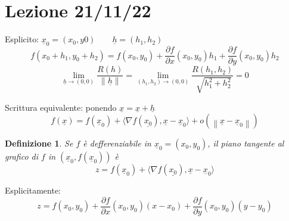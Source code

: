 \documentclass{scrreprt}
\newtheorem{defn}{Definizione}
\newenvironment{definition}{\begin{mdframed}[backgroundcolor=Ivory2]\begin{defn}}{\end{defn}\end{mdframed}}
\begin{document}
\section*{Lezione 21/11/22}

Esplicito: $\underline{x}_0 = (x_0, y0) \quad \quad \underline{h} = (h_1,h_2)$
\begin{equation}
	f(x_0 + h_1, y_0 + h_2) = f(x_0,y_0) + \frac{\partial f}{\partial x} (x_0, y_0) h_1 + \frac{\partial f}{\partial y} (x_0, y_0) h_2
\end{equation}
\begin{equation}
	\lim_{\underline{h} \to (0,0)} \frac{R(h)}{\left\lVert \underline{h} \right\rVert } = \lim_{(h_1, h_2) \to (0,0)} \frac{R(h_1, h_2)}{\sqrt[]{h_1^2 + h_2^2}} = 0
\end{equation}

Scrittura equivalente: ponendo $\underline{x} = \underline{x} + \underline{h}$
\begin{equation}
	f(\underline{x}) = f(\underline{x}_0) + \langle \nabla f(\underline{x_0}), \underline{x} - \underline{x}_0 \rangle + o(\left\lVert \underline{x} - \underline{x}_0 \right\rVert )
\end{equation}

\begin{definition}
	Se $f$ è defferenziabile in $\underline{x}_0 = (x_0,y_0)$, il piano tangente al grafico di $f$ in $(\underline{x}_0, f(\underline{x}_0))$ è
	\begin{equation}
		z = f(\underline{x}_0) + \langle \nabla f(\underline{x_0}), \underline{x} - \underline{x}_0 \rangle
	\end{equation}
\end{definition}
Esplicitamente:
\begin{equation}
	z = f(x_0,y_0) + \frac{\partial f}{\partial x} (x_0, y_0) (x - x_0) + \frac{\partial f}{\partial y} (x_0, y_0) (y - y_0)
\end{equation}
\end{document}
